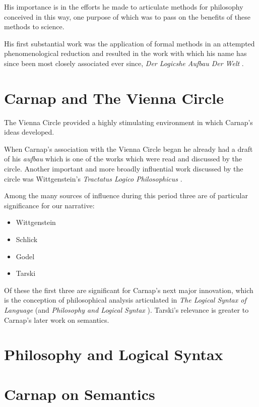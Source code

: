 His importance is in the efforts he made to articulate methods for philosophy conceived in this way, one purpose of which was to pass on the benefits of these methods to science.

His first substantial work was the application of formal methods in an attempted phenomenological reduction and resulted in the work with which his name has since been most closely associated ever since, \emph{Der Logicshe Aufbau Der Welt} \cite{carnap28}.

\section{Carnap and The Vienna Circle}

The Vienna Circle provided a highly stimulating environment in which Carnap's ideas developed.

When Carnap's association with the Vienna Circle began he already had a draft of his \emph{aufbau} which is one of the works which were read and discussed by the circle.
Another important and more broadly influential work discussed by the circle was Wittgenstein's  \emph{Tractatus Logico Philosophicus} \cite{wittgenstein1921}.

Among the many sources of influence during this period three are of particular significance for our narrative:

\begin{itemize}
\item Wittgenstein
\item Schlick
\item Godel
\item Tarski
\end{itemize}

Of these the first three are significant for Carnap's next major innovation, which is the conception of philosophical analysis articulated in \emph{The Logical Syntax of Language} \cite{carnap34,carnap37} (and \emph{Philosophy and Logical Syntax} \cite{carnap35}).
Tarski's relevance is greater to Carnap's later work on semantics.

\section{Philosophy and Logical Syntax}

\section{Carnap on Semantics}

